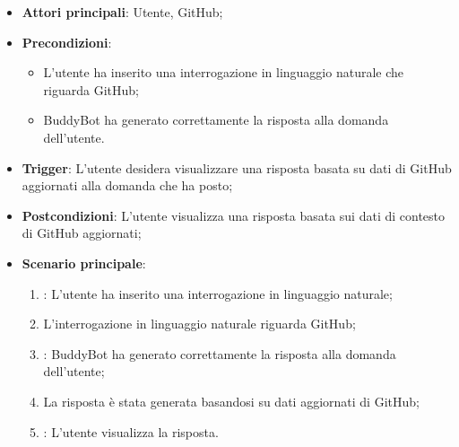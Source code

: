\hypertarget{UC11.1}{}

\begin{itemize}
    \item \textbf{Attori principali}: Utente, GitHub;
    \item \textbf{Precondizioni}: 
    \begin{itemize}
        \item L'utente ha inserito una interrogazione in linguaggio naturale che riguarda GitHub;
        \item BuddyBot ha generato correttamente la risposta alla domanda dell'utente.
    \end{itemize}
    \item \textbf{Trigger}: L'utente desidera visualizzare una risposta basata su dati di GitHub aggiornati alla domanda che ha posto;
    \item \textbf{Postcondizioni}: L'utente visualizza una risposta basata sui dati di contesto di GitHub aggiornati;
    \item \textbf{Scenario principale}: 
    \begin{enumerate}
        \item {}: L'utente ha inserito una interrogazione in linguaggio naturale;
        \item L'interrogazione in linguaggio naturale riguarda GitHub;
        \item {}: BuddyBot ha generato correttamente la risposta alla domanda dell'utente;
        \item La risposta è stata generata basandosi su dati aggiornati di GitHub;
        \item {}: L'utente visualizza la risposta.
    \end{enumerate}
\end{itemize}



\hypertarget{UC11.2}{}

